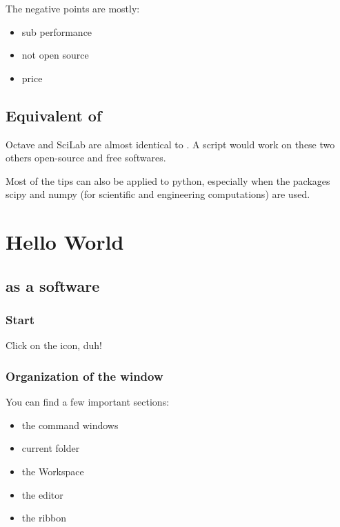 The negative points are mostly:
\begin{itemize}
	\item sub performance
	\item not open source
	\item {\color{red} price}
\end{itemize}


\subsection{Equivalent of \matlab }

Octave and SciLab are almost identical to \matlab. A \matlab script would work on these two others open-source and free softwares.

Most of the tips can also be applied to python, especially when the packages scipy and numpy (for scientific and engineering computations) are used.






\section{Hello World}

\subsection{\matlab as a software}
\subsubsection{Start \matlab}
Click on the icon, duh!
\subsubsection{Organization of the window}

You can find a few important sections:
\begin{itemize}
	\item the command windows \\
	\item current folder \\
	\item the Workspace \\
	\item the editor \\
	\item the ribbon \\
\end{itemize}

